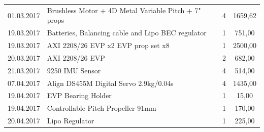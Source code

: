 \begin{table}[H]
\begin{tabular}{|l|l|c|c|}
\rowcolor{gainsboro}    01.03.2017 & Brushless Motor + 4D Metal Variable Pitch + 7" props & 4  & 1659,62  \\
                        19.03.2017 & Batteries, Balancing cable and Lipo BEC regulator & 1 & 751,00 \\
\rowcolor{gainsboro}    19.03.2017 & AXI 2208/26 EVP x2 EVP prop set x8 & 1  & 2500,00   \\
                        20.03.2017 & AXI 2208/26 EVP  & 2 & 682,00 \\
\rowcolor{gainsboro}    21.03.2017 & 9250 IMU Sensor & 4 & 514,00  \\
                        07.04.2017 & Align DS455M Digital Servo 2.9kg/0.04s  & 4 & 1435,00 \\
\rowcolor{gainsboro}    19.04.2017 & EVP Bearing Holder & 1 & 15,00   \\
                        19.04.2017 & Controllable Pitch Propeller 91mm & 1 & 170,00 \\
\rowcolor{gainsboro}    20.04.2017 & Lipo Regulator  & 1 & 225,00    \\
\hline
\end{tabular}                                                               
\end{table}


